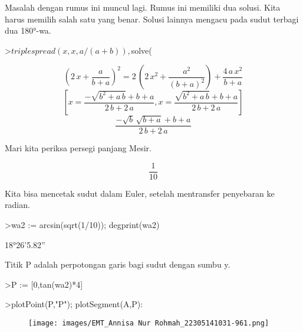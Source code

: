 \documentclass[a4paper,10pt]{article}
\begin{document}
\begin{eulernotebook}
\begin{eulercomment}
\begin{eulercomment}
\begin{eulercomment}
\begin{eulercomment}
\begin{eulercomment}
Masalah dengan rumus ini muncul lagi. Rumus ini memiliki dua solusi.
Kita harus memilih salah satu yang benar. Solusi lainnya mengacu pada
sudut terbagi dua 180°-wa.
\end{eulercomment}
\begin{eulerprompt}
>$triplespread(x,x,a/(a+b)), $solve(%
\end{eulerprompt}
\begin{eulerformula}
\[
 \left(2\,x+\frac{a}{b+a}\right)^2=2\,\left(2\,x^2+\frac{a^2}{\left(b+a\right)^2}\right)+\frac{4\,a\,x^2}{b+a}
\]
\[
 \left[ x=\frac{-\sqrt{b^2+a\,b}+b+a}{2\,b+2\,a} , x=\frac{\sqrt{b^2+a\,b}+b+a}{2\,b+2\,a} \right]
\]
\[
\frac{-\sqrt{b}\,\sqrt{b+a}+b+a}{2\,b+2\,a}
\]
\end{eulerformula}
\begin{eulercomment}
Mari kita periksa persegi panjang Mesir.
\end{eulercomment}
\begin{eulerformula}
\[
\frac{1}{10}
\]
\end{eulerformula}
\begin{eulercomment}
Kita bisa mencetak sudut dalam Euler, setelah mentransfer penyebaran
ke radian.
\end{eulercomment}
\begin{eulerprompt}
>wa2 := arcsin(sqrt(1/10)); degprint(wa2)
\end{eulerprompt}
\begin{euleroutput}
  18°26'5.82''
\end{euleroutput}
\begin{eulercomment}
Titik P adalah perpotongan garis bagi sudut dengan sumbu y.
\end{eulercomment}
\begin{eulerprompt}
>P := [0,tan(wa2)*4]
\end{eulerprompt}
\begin{euleroutput}
  [0,  1.33333]
\end{euleroutput}
\begin{eulerprompt}
>plotPoint(P,"P"); plotSegment(A,P):
\end{eulerprompt}
\begin{figure}[h]
    \centering
    \texttt{[image: images/EMT\_Annisa Nur Rohmah\_22305141031-961.png]}
\end{figure}
\begin{eulercomment}

\end{eulercomment}
\end{eulercomment}
\end{eulercomment}
\end{eulercomment}
\end{eulercomment}
\end{eulernotebook}
\end{document}
